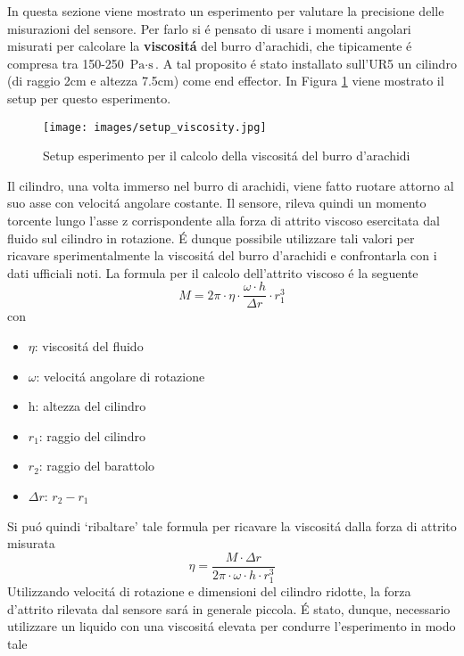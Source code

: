 In questa sezione viene mostrato un esperimento per valutare la precisione delle misurazioni del sensore. 
Per farlo si \'{e} pensato di usare i momenti angolari misurati per calcolare la \textbf{viscosit\'{a}} del burro d'arachidi, 
che tipicamente \'{e} compresa tra 150-250 $\text{Pa} \cdot \text{s}$. 
A tal proposito \'{e} stato installato sull'UR5 un cilindro (di raggio 2cm e altezza 7.5cm) come end effector. 
In Figura \ref{fig:peanut_butter} viene mostrato il setup per questo esperimento. 
\begin{figure}[H]
    \centering
    \texttt{[image: images/setup\_viscosity.jpg]}
    \caption{Setup esperimento per il calcolo della viscosit\'{a} del burro d'arachidi}
    \label{fig:peanut_butter}
\end{figure}
Il cilindro, una volta immerso nel burro di arachidi, viene fatto ruotare attorno al suo asse con velocit\'{a} angolare 
costante. Il sensore, rileva quindi un momento torcente lungo l'asse z corrispondente alla forza di attrito viscoso esercitata 
dal fluido sul cilindro in rotazione. \'{E} dunque possibile utilizzare tali valori per ricavare sperimentalmente 
la viscosit\'{a} del burro d'arachidi e confrontarla con i dati ufficiali noti. 
La formula per il calcolo dell'attrito viscoso \'{e} la seguente 
\begin{equation*}
    M = 2\pi \cdot \eta \cdot \frac{\omega \cdot h}{\Delta r} \cdot r_{1}^{3}
\end{equation*}
con 
\begin{itemize}
    \item $\eta$: viscosit\'{a} del fluido
    \item $\omega$: velocit\'{a} angolare di rotazione
    \item h: altezza del cilindro
    \item $r_{1}$: raggio del cilindro
    \item $r_{2}$: raggio del barattolo
    \item $\Delta r$: $r_{2} - r_{1}$
\end{itemize}
Si pu\'{o} quindi `ribaltare' tale formula per ricavare la viscosit\'{a} dalla forza di attrito misurata 
\begin{equation} \label{eq:eta}
    \eta = \frac{M \cdot \Delta r}{2\pi \cdot \omega \cdot h \cdot r_{1}^{3}}
\end{equation}
Utilizzando velocit\'{a} di rotazione e dimensioni del cilindro ridotte, la forza d'attrito rilevata dal sensore sar\'{a} in generale 
piccola. \'{E} stato, dunque, necessario utilizzare un liquido con una viscosit\'{a} elevata per condurre l'esperimento in modo tale 
